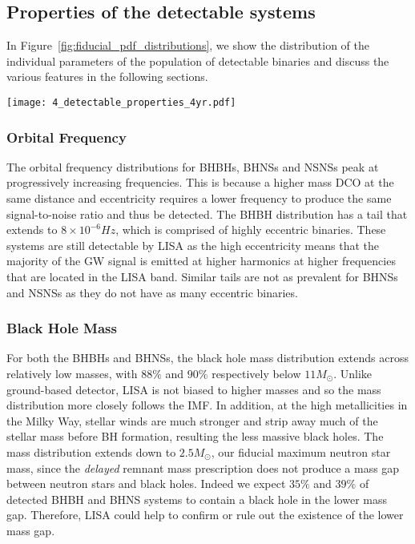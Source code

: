 \subsection{Properties of the detectable systems}\label{sec:fiducial_distributions}

In Figure~\ref{fig:fiducial_pdf_distributions}, we show the distribution of the individual parameters of the population of detectable binaries and discuss the various features in the following sections.

\begin{figure*}[htbp]
    \centering
    \texttt{[image: 4\_detectable\_properties\_4yr.pdf]}
    \caption{Properties of detectable systems for a 4-year LISA mission in our fiducial model. Each panel shows a kernel density estimator for a single property, coloured by DCO type. The shaded areas show the 1- and 2-$\sigma$ uncertainties (obtained via bootstrapping). The dotted lines in the black hole mass panel show the individual primary and secondary mass distributions. See Sec.~\ref{sec:fiducial_distributions} for a discussion.}
    \label{fig:fiducial_pdf_distributions}
\end{figure*}

\subsubsection{Orbital Frequency}
The orbital frequency distributions for BHBHs, BHNSs and NSNSs peak at progressively increasing frequencies. This is because a higher mass DCO at the same distance and eccentricity requires a lower frequency to produce the same signal-to-noise ratio and thus be detected. The BHBH distribution has a tail that extends to $8 \times 10^{-6} \unit{Hz}$, which is comprised of highly eccentric binaries. These systems are still detectable by LISA as the high eccentricity means that the majority of the GW signal is emitted at higher harmonics at higher frequencies that are located in the LISA band. Similar tails are not as prevalent for BHNSs and NSNSs as they do not have as many eccentric binaries.

\subsubsection{Black Hole Mass}
For both the BHBHs and BHNSs, the black hole mass distribution extends across relatively low masses, with $88\%$ and $90\%$ respectively below $11 \unit{M_{\odot}}$. Unlike ground-based detector, LISA is not biased to higher masses and so the mass distribution more closely follows the IMF. In addition, at the high metallicities in the Milky Way, stellar winds are much stronger and strip away much of the stellar mass before BH formation, resulting the less massive black holes. The mass distribution extends down to $2.5 \unit{M_{\odot}}$, our fiducial maximum neutron star mass, since the \citet{Fryer+2012} \textit{delayed} remnant mass prescription does not produce a mass gap between neutron stars and black holes. Indeed we expect $35\%$ and $39\%$ of detected BHBH and BHNS systems to contain a black hole in the lower mass gap. Therefore, LISA could help to confirm or rule out the existence of the lower mass gap.

